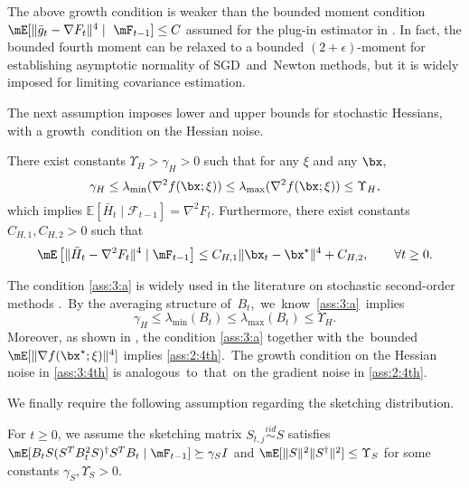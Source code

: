 The above growth condition is weaker than the bounded moment condition $\mE[\|\bar{g}_t-\nabla F_t\|^4\mid~\mF_{t-1}]\leq C$ assumed for the plug-in estimator in \cite{Na2022Statistical}. In fact, the bounded fourth moment can be relaxed to a bounded $(2+\epsilon)$-moment for establishing asymptotic normality of SGD~and~Newton methods, but it is widely imposed for limiting covariance estimation. 


The next assumption imposes lower and upper bounds for stochastic Hessians, with a growth~condition on the Hessian noise.

\begin{assumption}\label{ass:3}
There exist constants $\Upsilon_H>\gamma_H>0$ such that for any $\xi$ and any $\bx$,
\begin{equation}\label{ass:3:a}
\gamma_H\leq\lambda_{\min}(\nabla^2 f(\bx;\xi))\leq \lambda_{\max}(\nabla^2 f(\bx;\xi))\leq \Upsilon_H,
\end{equation}
which implies $\mathbb{E}[\bar{H}_t\mid \mathcal{F}_{t-1}]=\nabla^2 F_t$. Furthermore, there exist constants $C_{H,1}, C_{H,2}>0$ such that
\begin{equation}\label{ass:3:4th}
\mE\left[\|\bar{H}_t-\nabla^2 F_t\|^4\mid\mF_{t-1}\right]\leq C_{H,1}\|\bx_t-\bx^\star\|^4 + C_{H,2}, \quad\quad \forall t\geq 0.
\end{equation}

\end{assumption}

The condition \eqref{ass:3:a} is widely used in the literature on stochastic second-order methods \citep{Byrd2016Stochastic, Berahas2016Multi, Moritz2016Linearly}.~By the averaging structure of~$B_t$,~we~know~\eqref{ass:3:a}~implies
\begin{equation}\label{ass:3:c2}
\gamma_H\leq\lambda_{\min}(B_t)\leq\lambda_{\max}(B_t)\leq\Upsilon_H.
\end{equation}
Moreover, as shown in \cite[Lemma 3.1]{Chen2020Statistical}, the condition \eqref{ass:3:a} together with the~bounded $\mE[\|\nabla f(\bx^\star;\xi)\|^4]$ implies \eqref{ass:2:4th}.~The growth condition on the Hessian noise in \eqref{ass:3:4th} is analogous~to~that~on the gradient noise in \eqref{ass:2:4th}. 


We finally require the following assumption regarding the sketching distribution.

\begin{assumption}\label{ass:4}
For $t\geq 0$, we assume the sketching matrix $S_{t,j}\stackrel{iid}{\sim}S$ satisfies 
$\mE[B_tS(S^TB_t^2S)^{\dagger}S^TB_t \mid \mF_{t-1}]\succeq \gamma_S I$ and $\mE[\|S\|^2\|S^{\dagger}\|^2]\leq \Upsilon_S$ for some constants $\gamma_S, \Upsilon_S>0$.

\end{assumption}


